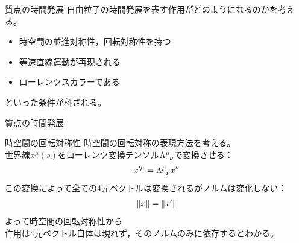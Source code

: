 \documentclass[unicode, aspectratio=169, 12pt]{beamer}
\newcommand{\diff}[2]{\frac{\mathrm{d} #1}{\mathrm{d} #2}} %
\begin{document}
\begin{frame}{質点の時間発展}
    自由粒子の時間発展を表す作用がどのようになるのかを考える。\\
    \begin{itemize}
        \item 時空間の並進対称性，回転対称性を持つ
        \item 等速直線運動が再現される
        \item ローレンツスカラーである
    \end{itemize}
    といった条件が科される。
\end{frame}


\begin{frame}{質点の時間発展}
    \begin{block}{時空間の回転対称性}
        時空間の回転対称の表現方法を考える。\\
        世界線$x^\mu(s)$をローレンツ変換テンソル$\tensor{\Lambda}{^\mu_\nu}$で変換させる：
        \begin{align*}
            x'^\mu=\tensor{\Lambda}{^\mu_\nu}x^\nu
        \end{align*}
        この変換によって全ての4元ベクトルは変換されるがノルムは変化しない：
        \begin{align*}
            \norm{x}=\norm{x'}
        \end{align*}
        よって時空間の回転対称性から\\
        作用は4元ベクトル自体は現れず，そのノルムのみに依存するとわかる。
    \end{block}
\end{frame}
\end{document}
